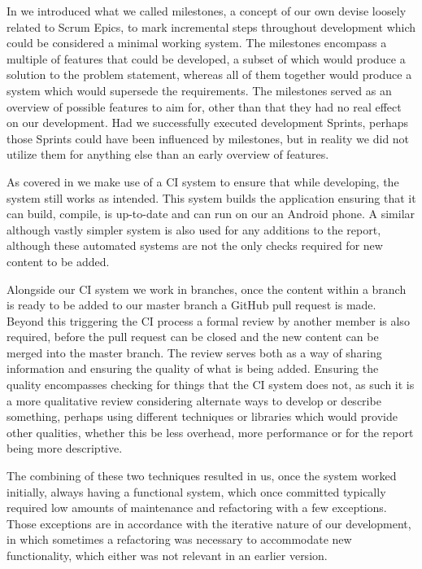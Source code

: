 In  we introduced what we called milestones, a concept of our own devise loosely related to Scrum Epics, to mark incremental steps throughout development which could be considered a minimal working system.
The milestones encompass a multiple of features that could be developed, a subset of which would produce a solution to the problem statement, whereas all of them together would produce a system which would supersede the requirements.
The milestones served as an overview of possible features to aim for, other than that they had no real effect on our development.
Had we successfully executed development Sprints, perhaps those Sprints could have been influenced by milestones, but in reality we did not utilize them for anything else than an early overview of features.

\bigskip
As covered in  we make use of a \ac{CI} system to ensure that while developing, the system still works as intended.
This system builds the application ensuring that it can build, compile, is up-to-date and can run on our an Android phone.
A similar although vastly simpler system is also used for any additions to the report, although these automated systems are not the only checks required for new content to be added.

Alongside our \ac{CI} system we work in branches, once the content within a branch is ready to be added to our master branch a GitHub pull request is made.
Beyond this triggering the \ac{CI} process a formal review by another member is also required, before the pull request can be closed and the new content can be merged into the master branch.
The review serves both as a way of sharing information and ensuring the quality of what is being added.
Ensuring the quality encompasses checking for things that the \ac{CI} system does not, as such it is a more qualitative review considering alternate ways to develop or describe something, perhaps using different techniques or libraries which would provide other qualities, whether this be less overhead, more performance or for the report being more descriptive.

The combining of these two techniques resulted in us, once the system worked initially, always having a functional system, which once committed typically required low amounts of maintenance and refactoring with a few exceptions.
Those exceptions are in accordance with the iterative nature of our development, in which sometimes a refactoring was necessary to accommodate new functionality, which either was not relevant in an earlier version.

